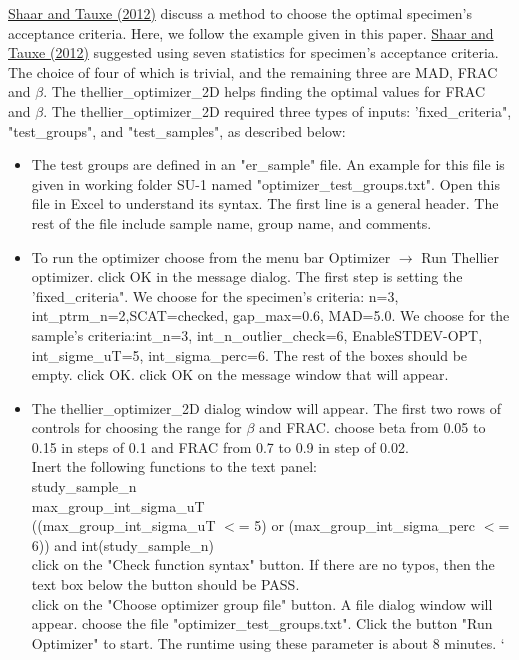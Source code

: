 \documentclass[11pt]{book}
\begin{document}
{{\begin{itemize}
\href{http://magician.ucsd.edu/~ltauxe/CV/open/shaar12.pdf}{Shaar and Tauxe (2012)} \nocite{shaar12} discuss a method to choose the optimal specimen's acceptance criteria. Here, we follow the example given in this paper. \href{http://magician.ucsd.edu/~ltauxe/CV/open/shaar12.pdf}{Shaar and Tauxe (2012)} suggested using  seven statistics for specimen's acceptance criteria. The choice of four of which is trivial, and the remaining three are MAD, FRAC and $\beta$. The thellier\_optimizer\_2D helps finding the optimal values for FRAC and $\beta$.  The thellier\_optimizer\_2D  required three types of inputs: 'fixed\_criteria", "test\_groups", and "test\_samples", as described below:  
\begin{itemize}
\item The test groups are defined in an "er\_sample" file. An example for this file is given in working folder SU-1 named  "optimizer\_test\_groups.txt". Open this file in Excel to understand its syntax. The first line is a general header. The rest of the file include sample name, group name, and comments. 
\item To run the optimizer choose from the menu bar Optimizer $\rightarrow$ Run Thellier optimizer. click OK in the  message dialog. The first step is setting the 'fixed\_criteria". We choose for the specimen's criteria: n=3, int\_ptrm\_n=2,SCAT=checked, gap\_max=0.6, MAD=5.0. We choose for the sample's criteria:int\_n=3, int\_n\_outlier\_check=6, EnableSTDEV-OPT, int\_sigme\_uT=5, int\_sigma\_perc=6. The rest of the boxes should be empty. click OK. click OK on the message window that will appear.
\item The thellier\_optimizer\_2D dialog window will appear. The first two rows of controls for choosing the range for $\beta$ and FRAC. choose beta from 0.05 to 0.15 in steps of 0.1 and FRAC from 0.7 to 0.9 in step of 0.02. \\
Inert the following functions to the text panel:\\
study\_sample\_n\\
max\_group\_int\_sigma\_uT\\
((max\_group\_int\_sigma\_uT $<$= 5) or (max\_group\_int\_sigma\_perc $<$= 6)) and  int(study\_sample\_n) \\
click on the "Check function syntax" button. If there are no typos, then the text box below the button should be PASS.\\
click on the "Choose optimizer group file" button. A file dialog window will appear. choose the file "optimizer\_test\_groups.txt". Click the button "Run Optimizer" to start. The runtime using these parameter is about 8 minutes. `

\end{itemize}
\end{itemize}}}
\end{document}
